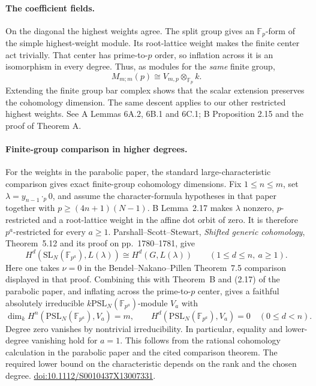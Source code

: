 \paragraph{The coefficient fields.}
On the diagonal the highest weights agree. The split group gives an
\(\mathbb F_p\)-form of the simple highest-weight module. Its root-lattice
weight makes the finite center act trivially. That center has
prime-to-\(p\) order, so inflation across it is an isomorphism in every
degree. Thus, as modules for the \emph{same} finite group,
\[
 M_{m;m}(p)\cong V_{m,p}\otimes_{\mathbb F_p}k.
\]
Extending the finite group bar complex shows that the scalar extension
preserves the cohomology dimension. The same descent applies to our
other restricted highest weights. See A Lemmas 6A.2, 6B.1 and 6C.1;
B Proposition 2.15 and the proof of Theorem A.

\paragraph{Finite-group comparison in higher degrees.}
For the weights in the parabolic paper, the standard large-characteristic comparison gives exact
finite-group cohomology dimensions.
Fix \(1\le n\le m\), set \(\lambda=y_{n-1}\cdot_p0\), and assume
the character-formula hypotheses in that paper together with
\(p\ge(4n+1)(N-1)\).
B Lemma~2.17 makes \(\lambda\) nonzero, \(p\)-restricted and a root-lattice
weight in the affine dot orbit of zero. It is therefore \(p^a\)-restricted
for every \(a\ge1\).
Parshall--Scott--Stewart, \emph{Shifted generic cohomology},
Theorem~5.12 and its proof on pp.~1780--1781, give
\[
 H^d(\mathrm{SL}_N(\mathbb F_{p^a}),L(\lambda))
 \cong H^d(G,L(\lambda))
 \qquad(1\le d\le n,\ a\ge1).
\]
Here one takes \(\nu=0\) in the Bendel--Nakano--Pillen
Theorem~7.5 comparison displayed in that proof.
Combining this with Theorem~B and (2.17) of the parabolic paper, and inflating across the
prime-to-\(p\) center, gives a faithful absolutely irreducible
\(k\mathrm{PSL}_N(\mathbb F_{p^a})\)-module \(V_a\) with
\[
 \dim_k H^n(\mathrm{PSL}_N(\mathbb F_{p^a}),V_a)=m,\qquad
 H^d(\mathrm{PSL}_N(\mathbb F_{p^a}),V_a)=0\quad(0\le d<n).
\]
Degree zero vanishes by nontrivial irreducibility.
In particular, equality and lower-degree vanishing hold for \(a=1\).
This follows from the rational cohomology calculation in the parabolic paper and the cited
comparison theorem.
The required lower bound on the characteristic depends on the rank and
the chosen degree.
\href{https://doi.org/10.1112/S0010437X13007331}{doi:10.1112/S0010437X13007331}.
